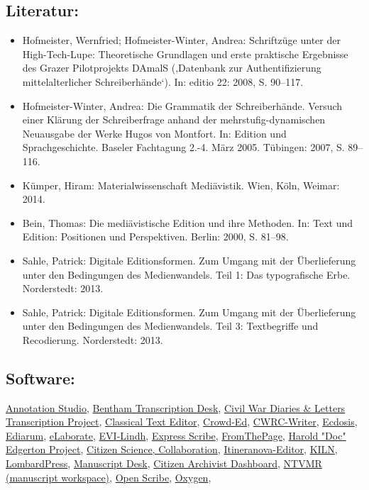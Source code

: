 \documentclass{article}
\begin{document}
        \subsection*{Literatur:}\begin{itemize}\item Hofmeister, Wernfried; Hofmeister-Winter, Andrea: Schriftzüge unter der High-Tech-Lupe: Theoretische Grundlagen und erste praktische Ergebnisse des Grazer Pilotprojekts DAmalS (‚Datenbank zur Authentifizierung mittelalterlicher Schreiberhände‘). In: editio 22: 2008, S. 90–117.\item Hofmeister-Winter, Andrea: Die Grammatik der Schreiberhände. Versuch einer Klärung der Schreiberfrage anhand der mehrstufig-dynamischen Neuausgabe der Werke Hugos von Montfort. In: Edition und Sprachgeschichte. Baseler Fachtagung 2.-4. März 2005. Tübingen: 2007, S. 89–116.\item Kümper, Hiram: Materialwissenschaft Mediävistik. Wien, Köln, Weimar: 2014.\item Bein, Thomas: Die mediävistische Edition und ihre Methoden. In: Text und Edition: Positionen und Perspektiven. Berlin: 2000, S. 81–98.\item Sahle, Patrick: Digitale Editionsformen. Zum Umgang mit der Überlieferung unter den Bedingungen des Medienwandels. Teil 1: Das typografische Erbe. Norderstedt: 2013.\item Sahle, Patrick: Digitale Editionsformen. Zum Umgang mit der Überlieferung unter den Bedingungen des Medienwandels. Teil 3: Textbegriffe und Recodierung. Norderstedt: 2013.\end{itemize}\subsection*{Software:}\href{https://www.annotationstudio.org/}{Annotation Studio}, \href{http://transcribe-bentham.ucl.ac.uk/td/Transcribe_Bentham}{Bentham Transcription Desk}, \href{https://diyhistory.lib.uiowa.edu}{Civil War Diaries & Letters Transcription Project}, \href{http://cte.oeaw.ac.at/}{Classical Text Editor}, \href{https://github.com/gsbodine/crowd-ed}{Crowd-Ed}, \href{https://wiki.tei-c.org/index.php/CWRC-Writer}{CWRC-Writer}, \href{https://ecdosis.rocks/Home/}{Ecdosis}, \href{http://www.bbaw.de/telota/software/ediarum}{Ediarum}, \href{https://www.e-laborate.nl/en/}{eLaborate}, \href{http://linhd.es/en/}{EVI-Lindh}, \href{https://www.nch.com.au/scribe/index.html}{Express Scribe}, \href{https://fromthepage.com/}{FromThePage}, \href{http://edgerton-digital-collections.org/notebooks}{Harold "Doc" Edgerton Project}, \href{https://islandora.ca/}{Citizen Science, Collaboration}, \href{http://www.mom-wiki.uni-koeln.de/}{Itineranova-Editor}, \href{https://kcl-ddh.github.io/kiln/}{KILN}, \href{http://lombardpress.org/}{LombardPress}, \href{https://manuscriptdesk.uantwerpen.be/md/Main_Page}{Manuscript Desk}, \href{https://www.archives.gov/citizen-archivist/missions}{Citizen Archivist Dashboard}, \href{http://ntvmr.uni-muenster.de/de/manuscript-workspace}{NTVMR (manuscript workspace)}, \href{http://code.google.com/p/openscribe/}{Open Scribe}, \href{http://oxygenxml.com/}{Oxygen}, 
\end{document}
